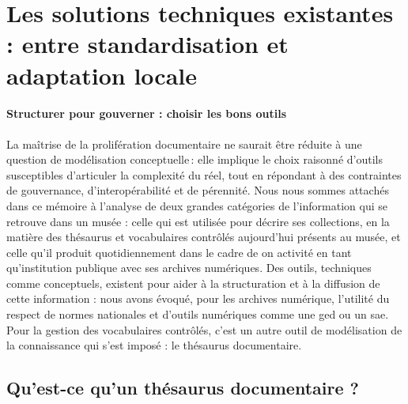 \section{\label{III-A-2}Les solutions techniques existantes : entre standardisation et adaptation locale}

\paragraph*{Structurer pour gouverner : choisir les bons outils}
La maîtrise de la prolifération documentaire ne saurait être réduite à une question de modélisation conceptuelle : elle implique le choix raisonné d’outils susceptibles d’articuler la complexité du réel, tout en répondant à des contraintes de gouvernance, d’interopérabilité et de pérennité. Nous nous sommes attachés dans ce mémoire à l'analyse de deux grandes catégories de l'information qui se retrouve dans un musée : celle qui est utilisée pour décrire ses collections, en la matière des thésaurus et vocabulaires contrôlés aujourd'hui présents au musée, et celle qu'il produit quotidiennement dans le cadre de on activité en tant qu'institution publique avec ses archives numériques. Des outils, techniques comme conceptuels, existent pour aider à la structuration et à la diffusion de cette information : nous avons évoqué, pour les archives numérique, l'utilité du respect de normes nationales et d'outils numériques comme une \gls{ged} ou un \gls{sae}. Pour la gestion des vocabulaires contrôlés, c'est un autre outil de modélisation de la connaissance qui s'est imposé : le thésaurus documentaire.

\subsection{\label{III-A-2.1}Qu’est-ce qu’un thésaurus documentaire ?}


